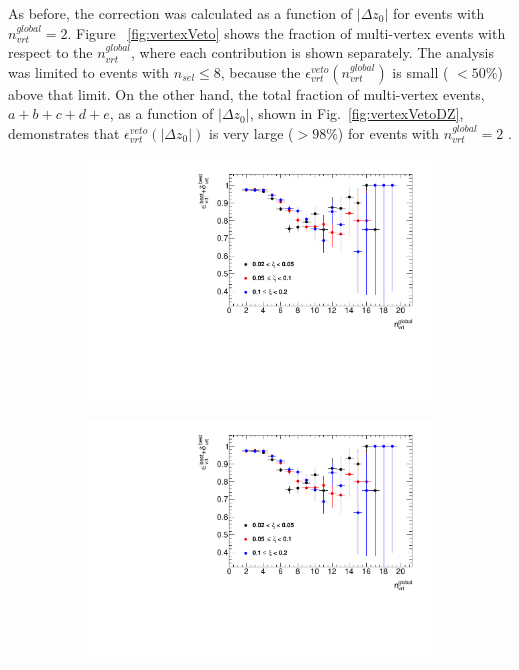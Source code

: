 As before, the correction was calculated as a function of $|\Delta z_0|$ for events with $n^{global}_{vrt}=2$. Figure~ \ref{fig:vertexVeto} shows the fraction of multi-vertex events  with respect to the $n_{vrt}^{global}$, where each contribution is shown separately. The analysis was limited to events with $n_{sel}\leq8$, because the $\epsilon_{vrt}^{veto}(n_{vrt}^{global})$ is small ( $<50\%$) above that limit. On the other hand,  the total fraction of multi-vertex events, $a+b+c+d+e$, as a function of $|\Delta z_0|$, shown in Fig.~\ref{fig:vertexVetoDZ}, demonstrates that $\epsilon_{vrt}^{veto}(|\Delta z_0|)$ is very large ($>98\%$) for events with $n^{global}_{vrt}=2$ .
\captionsetup{format=plain,indention=0pt,justification=justified}
\begin{figure}[h!]
	\centering
	\begin{subfigure}{.49\textwidth}
		\includegraphics[width=\textwidth,page=3]{chapters/chrgSTAR/img/vertex/vertexEffi_ksi.pdf}
	\end{subfigure}
	\begin{subfigure}{.49\textwidth}
		\includegraphics[width=\textwidth,page=4]{chapters/chrgSTAR/img/vertex/vertexEffi_ksi.pdf}

\end{subfigure}
\end{figure}

